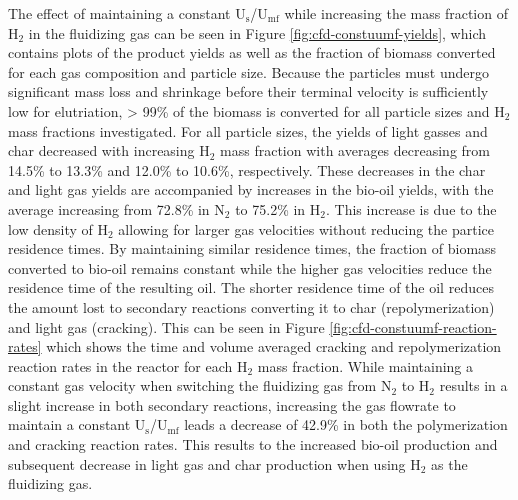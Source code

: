 The effect of maintaining a constant U$_\text{s}$/U$_\text{mf}$ while increasing the mass fraction of H$_2$ in the fluidizing gas can be seen in Figure \ref{fig:cfd-constuumf-yields}, which contains plots of the product yields as well as the fraction of biomass converted for each gas composition and particle size. Because the particles must undergo significant mass loss and shrinkage before their terminal velocity is sufficiently low for elutriation, > 99\% of the biomass is converted for all particle sizes and H$_2$ mass fractions investigated. For all particle sizes, the yields of light gasses and char decreased with increasing H$_2$ mass fraction with averages decreasing from 14.5\% to 13.3\% and 12.0\% to 10.6\%, respectively. These decreases in the char and light gas yields are accompanied by increases in the bio-oil yields, with the average increasing from 72.8\% in N$_2$ to 75.2\% in H$_2$. This increase is due to the low density of H$_2$ allowing for larger gas velocities without reducing the partice residence times. By maintaining similar residence times, the fraction of biomass converted to bio-oil remains constant while the higher gas velocities reduce the residence time of the resulting oil. The shorter residence time of the oil reduces the amount lost to secondary reactions converting it to char (repolymerization) and light gas (cracking). This can be seen in Figure \ref{fig:cfd-constuumf-reaction-rates} which shows the time and volume averaged cracking and repolymerization reaction rates in the reactor for each H$_2$ mass fraction. While maintaining a constant gas velocity when switching the fluidizing gas from N$_2$ to H$_2$ results in a slight increase in both secondary reactions, increasing the gas flowrate to maintain a constant U$_\text{s}$/U$_\text{mf}$ leads a decrease of 42.9\% in both the polymerization and cracking reaction rates. This results to the increased bio-oil production and subsequent decrease in light gas and char production when using H$_2$ as the fluidizing gas.


